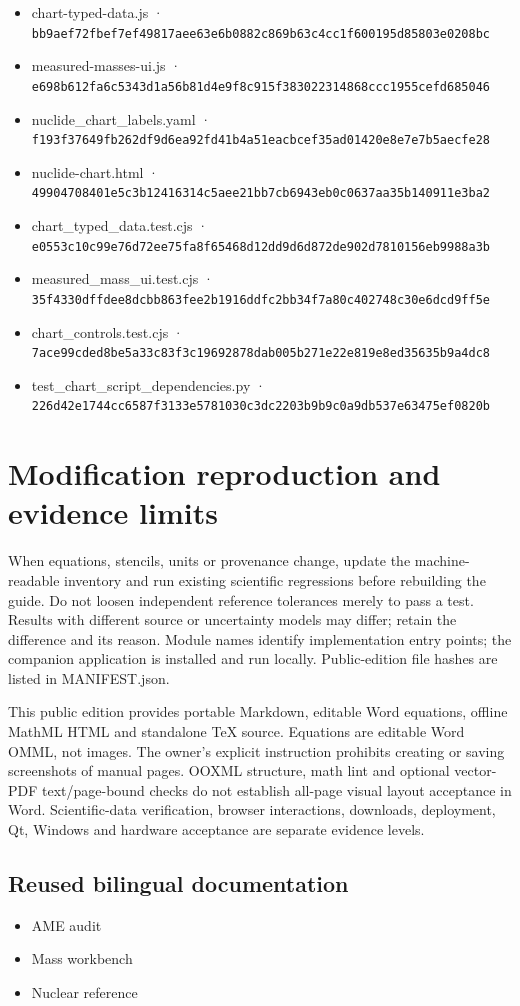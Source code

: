 \documentclass[
  11pt,
  letterpaper,
]{article}
\providecommand{\tightlist}{%
  \setlength{\itemsep}{0pt}\setlength{\parskip}{0pt}}
\begin{document}
\begin{itemize}
\item
  chart-typed-data.js ·
  \texttt{bb9aef72fbef7ef49817aee63e6b0882c869b63c4cc1f600195d85803e0208bc}
\item
  measured-masses-ui.js ·
  \texttt{e698b612fa6c5343d1a56b81d4e9f8c915f383022314868ccc1955cefd685046}
\item
  nuclide\_chart\_labels.yaml ·
  \texttt{f193f37649fb262df9d6ea92fd41b4a51eacbcef35ad01420e8e7e7b5aecfe28}
\item
  nuclide-chart.html ·
  \texttt{49904708401e5c3b12416314c5aee21bb7cb6943eb0c0637aa35b140911e3ba2}
\item
  chart\_typed\_data.test.cjs ·
  \texttt{e0553c10c99e76d72ee75fa8f65468d12dd9d6d872de902d7810156eb9988a3b}
\item
  measured\_mass\_ui.test.cjs ·
  \texttt{35f4330dffdee8dcbb863fee2b1916ddfc2bb34f7a80c402748c30e6dcd9ff5e}
\item
  chart\_controls.test.cjs ·
  \texttt{7ace99cded8be5a33c83f3c19692878dab005b271e22e819e8ed35635b9a4dc8}
\item
  test\_chart\_script\_dependencies.py ·
  \texttt{226d42e1744cc6587f3133e5781030c3dc2203b9b9c0a9db537e63475ef0820b}
\end{itemize}

\section{Modification reproduction and evidence
limits}\label{modification-reproduction-and-evidence-limits}

When equations, stencils, units or provenance change, update the
machine-readable inventory and run existing scientific regressions
before rebuilding the guide. Do not loosen independent reference
tolerances merely to pass a test. Results with different source or
uncertainty models may differ; retain the difference and its reason.
Module names identify implementation entry points; the companion
application is installed and run locally. Public-edition file hashes are
listed in MANIFEST.json.

This public edition provides portable Markdown, editable Word equations,
offline MathML HTML and standalone TeX source. Equations are editable
Word OMML, not images. The owner's explicit instruction prohibits
creating or saving screenshots of manual pages. OOXML structure, math
lint and optional vector-PDF text/page-bound checks do not establish
all-page visual layout acceptance in Word. Scientific-data verification,
browser interactions, downloads, deployment, Qt, Windows and hardware
acceptance are separate evidence levels.

\subsection{Reused bilingual
documentation}\label{reused-bilingual-documentation}

\begin{itemize}
\tightlist
\item
  AME audit
\item
  Mass workbench
\item
  Nuclear reference
\end{itemize}
\end{document}
